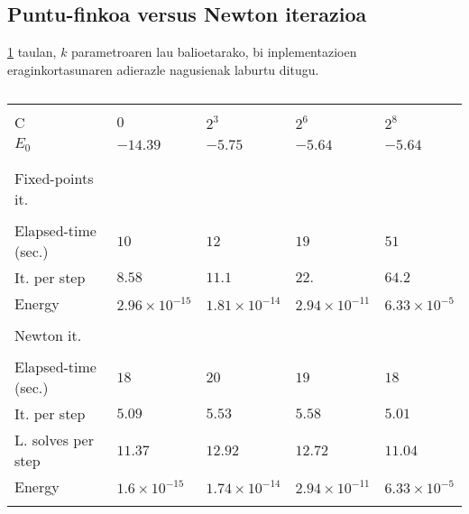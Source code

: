 \subsection{Puntu-finkoa versus Newton iterazioa}


\ref{tab:fp1} taulan, $k$ parametroaren lau balioetarako, bi inplementazioen eraginkortasunaren adierazle nagusienak laburtu ditugu.

\begin{table}[h!]
\caption[Fixed-point percentage of steps and mean iterations.] 
{}
\label{tab:fp1}       %
\centering
{%
\begin{tabular}{ l l l l l } 
 \hline
\\
 C               & $0$  & $2^3$ & $2^6$ & $2^8$ \\
 $E_0$           & $-14.39$  & $-5.75$ & $-5.64$ & $-5.64$ \\ 
\\
 \hline
\\
 Fixed-points it.&           &         &         &         \\
 \cline{1-1}     &           &         &         &         \\
 Elapsed-time (sec.)    & $10$      & $12$    & $19$    & $51$    \\ 
 It. per step    & $8.58$    & $11.1$  & $22.$  & $64.2$  \\
 Energy          & $2.96\times 10^{-15}$ & $1.81\times 10^{-14}$ & $2.94\times 10^{-11}$ & $6.33\times 10^{-5}$ \\
 \\
 Newton it.            &           &         &         &         \\
 \cline{1-1}           &           &         &         &         \\
 Elapsed-time (sec.)   & $18$      & $20$    & $19$    & $18$     \\
 It. per step          & $5.09$    & $5.53$  & $5.58$  & $5.01$   \\
 L. solves per step    & $11.37$   & $12.92$  & $12.72$  & $11.04$ \\
 Energy                & $1.6\times 10^{-15}$ & $1.74\times 10^{-14}$ & $2.94\times 10^{-11}$ & $6.33\times 10^{-5}$ \\   
 \\  
   \hline
 \end{tabular}}
\end{table}


